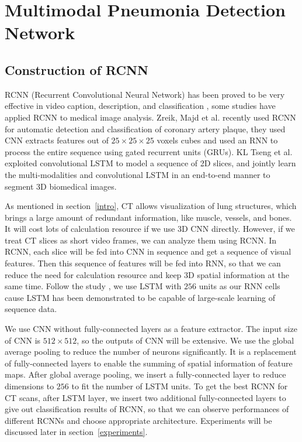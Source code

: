\documentclass[journal]{IEEEtran}
\begin{document}
\section{Multimodal Pneumonia Detection Network }
\label{MPDNetwork}
\subsection{Construction of RCNN}
\label{RCNN}
RCNN (Recurrent Convolutional Neural Network) has been proved to be very effective in video caption, description, and classification \cite{Donahue2015Long, Aafaq2019Spatio}, some studies have applied RCNN to medical image analysis. Zreik, Majd et al. \cite{Zreik2018A} recently used RCNN for automatic detection and classification of coronary artery plaque, they used CNN extracts features out of $ 25\times25\times25$ voxels cubes and used an RNN to process the entire sequence using gated recurrent units (GRUs)\cite{chung2014empirical}. KL Tseng et al. \cite{tseng2017joint} exploited convolutional LSTM to model a sequence of 2D slices, and jointly learn the multi-modalities and convolutional LSTM in an end-to-end manner to segment 3D biomedical images.

As mentioned in section~\ref{intro}, CT allows visualization of lung structures, which brings a large amount of redundant information, like muscle, vessels, and bones. It will cost lots of calculation resource if we use 3D CNN directly. However, if we treat CT slices as short video frames, we can analyze them using RCNN. In RCNN, each slice will be fed into CNN in sequence and get a sequence of visual features. Then this sequence of features will be fed into RNN, so that we can reduce the need for calculation resource and keep 3D spatial information at the same time. 
Follow the study \cite{Donahue2015Long}, we use LSTM with $256$ units as our RNN cells cause LSTM has been demonstrated to be capable of large-scale learning of sequence data. 

We use CNN without fully-connected layers as a feature extractor. The input size of CNN is $512 \times 512$, so the outputs of CNN will be extensive. We use the global average pooling \cite{lin2014network} to reduce the number of neurons significantly. It is a replacement of fully-connected layers to enable the summing of spatial information of feature maps. After global average pooling, we insert a fully-connected layer to reduce dimensions to $256$ to fit the number of LSTM units.
To get the best RCNN for CT scans, after LSTM layer, we insert two additional fully-connected layers to give out classification results of RCNN, so that we can observe performances of different RCNNs and choose appropriate architecture. Experiments will be discussed later in section~\ref{experiments}.
\end{document}
